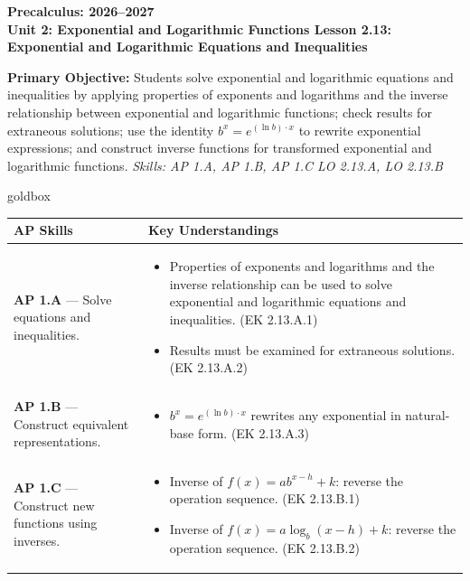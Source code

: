 \documentclass[10pt]{article}
\newcommand{\CourseName}{Precalculus}
\newcommand{\SchoolYear}{2026--2027}
\newcommand{\UnitNumberName}{Unit 2: Exponential and Logarithmic Functions \quad}
\newcommand{\LessonNumberName}{Lesson 2.13: Exponential and Logarithmic Equations and Inequalities}
\begin{document}
\begin{center}
    {\Large\bfseries \CourseName: \SchoolYear \\
    {\small\bfseries \UnitNumberName \LessonNumberName}}
\end{center}

\begin{tcolorbox}[colback=sky, colframe=navy, boxrule=0.9pt, arc=2mm,
    left=2mm, right=2mm, top=1.5mm, bottom=1.5mm]
    \textbf{Primary Objective:} Students solve exponential and logarithmic equations and
    inequalities by applying properties of exponents and logarithms and the inverse
    relationship between exponential and logarithmic functions; check results for extraneous
    solutions; use the identity $b^x = e^{(\ln b)\cdot x}$ to rewrite exponential expressions;
    and construct inverse functions for transformed exponential and logarithmic functions.
    \hfill\textit{\small Skills: AP 1.A, AP 1.B, AP 1.C \quad LO 2.13.A, LO 2.13.B}
\end{tcolorbox}

\renewcommand{\arraystretch}{1.6}
\begin{skillbox}{goldbox}
\begin{tabularx}{\linewidth}{@{}X X@{}}
\textbf{AP Skills} &
\textbf{Key Understandings} \\
\midrule
\textbf{AP 1.A} --- Solve equations and inequalities. &
\begin{itemize}[leftmargin=1.2em,itemsep=2pt,topsep=0pt]
  \item Properties of exponents and logarithms and the inverse relationship can be used to
        solve exponential and logarithmic equations and inequalities. (EK 2.13.A.1)
  \item Results must be examined for extraneous solutions. (EK 2.13.A.2)
\end{itemize} \\
\textbf{AP 1.B} --- Construct equivalent representations. &
\begin{itemize}[leftmargin=1.2em,itemsep=2pt,topsep=0pt]
  \item $b^x = e^{(\ln b)\cdot x}$ rewrites any exponential in natural-base form.
        (EK 2.13.A.3)
\end{itemize} \\
\textbf{AP 1.C} --- Construct new functions using inverses. &
\begin{itemize}[leftmargin=1.2em,itemsep=2pt,topsep=0pt]
  \item Inverse of $f(x)=ab^{x-h}+k$: reverse the operation sequence. (EK 2.13.B.1)
  \item Inverse of $f(x)=a\log_b(x-h)+k$: reverse the operation sequence. (EK 2.13.B.2)
\end{itemize} \\
\end{tabularx}
\end{skillbox}
\end{document}
